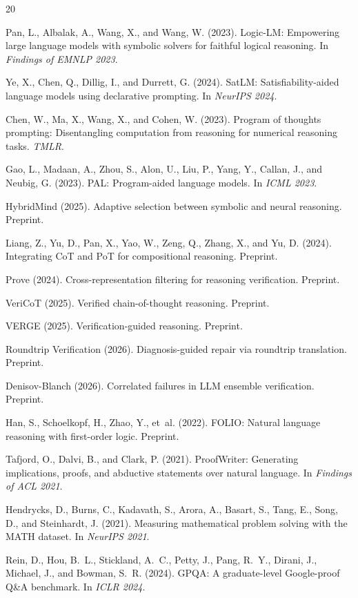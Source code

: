 \documentclass[11pt,a4paper]{article}
\begin{document}
\begin{thebibliography}{20}

Pan, L., Albalak, A., Wang, X., and Wang, W. (2023).
Logic-LM: Empowering large language models with symbolic solvers for faithful logical reasoning.
In \emph{Findings of EMNLP 2023}.

Ye, X., Chen, Q., Dillig, I., and Durrett, G. (2024).
SatLM: Satisfiability-aided language models using declarative prompting.
In \emph{NeurIPS 2024}.

Chen, W., Ma, X., Wang, X., and Cohen, W. (2023).
Program of thoughts prompting: Disentangling computation from reasoning for numerical reasoning tasks.
\emph{TMLR}.

Gao, L., Madaan, A., Zhou, S., Alon, U., Liu, P., Yang, Y., Callan, J., and Neubig, G. (2023).
PAL: Program-aided language models.
In \emph{ICML 2023}.

HybridMind (2025).
Adaptive selection between symbolic and neural reasoning.
Preprint.

Liang, Z., Yu, D., Pan, X., Yao, W., Zeng, Q., Zhang, X., and Yu, D. (2024).
Integrating CoT and PoT for compositional reasoning.
Preprint.

Prove (2024).
Cross-representation filtering for reasoning verification.
Preprint.

VeriCoT (2025).
Verified chain-of-thought reasoning.
Preprint.

VERGE (2025).
Verification-guided reasoning.
Preprint.

Roundtrip Verification (2026).
Diagnosis-guided repair via roundtrip translation.
Preprint.

Denisov-Blanch (2026).
Correlated failures in LLM ensemble verification.
Preprint.

Han, S., Schoelkopf, H., Zhao, Y., et~al. (2022).
FOLIO: Natural language reasoning with first-order logic.
Preprint.

Tafjord, O., Dalvi, B., and Clark, P. (2021).
ProofWriter: Generating implications, proofs, and abductive statements over natural language.
In \emph{Findings of ACL 2021}.

Hendrycks, D., Burns, C., Kadavath, S., Arora, A., Basart, S., Tang, E., Song, D., and Steinhardt, J. (2021).
Measuring mathematical problem solving with the MATH dataset.
In \emph{NeurIPS 2021}.

Rein, D., Hou, B.~L., Stickland, A.~C., Petty, J., Pang, R.~Y., Dirani, J., Michael, J., and Bowman, S.~R. (2024).
GPQA: A graduate-level Google-proof Q\&A benchmark.
In \emph{ICLR 2024}.

\end{thebibliography}
\end{document}
